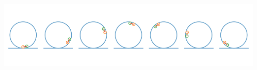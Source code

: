 

\begin{center}
    \includegraphics[width = \textwidth]{figures/mathplots/tony-hawk.pdf}
\end{center}
